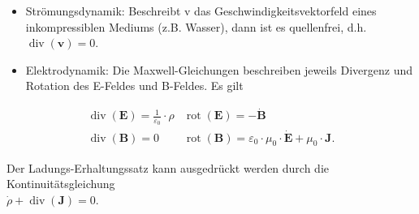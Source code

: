 \documentclass[10pt]{article}
\begin{document}
\begin{itemize}
  \item Strömungsdynamik: Beschreibt v das Geschwindigkeitsvektorfeld eines inkompressiblen Mediums (z.B. Wasser), dann ist es quellenfrei, d.h.\\
$\operatorname{div}(\mathbf{v})=0$.
  \item Elektrodynamik: Die Maxwell-Gleichungen beschreiben jeweils Divergenz und Rotation des E-Feldes und B-Feldes. Es gilt
\end{itemize}

\[
\begin{array}{l|l}
\operatorname{div}(\mathbf{E})=\frac{1}{\varepsilon_{0}} \cdot \rho & \operatorname{rot}(\mathbf{E})=-\dot{\mathbf{B}}  \tag{2.163}\\
\operatorname{div}(\mathbf{B})=0 & \operatorname{rot}(\mathbf{B})=\varepsilon_{0} \cdot \mu_{0} \cdot \dot{\mathbf{E}}+\mu_{0} \cdot \mathbf{J} .
\end{array}
\]

Der Ladungs-Erhaltungssatz kann ausgedrückt werden durch die Kontinuitätsgleichung\\
$\dot{\rho}+\operatorname{div}(\mathbf{J})=0$.
\end{document}
